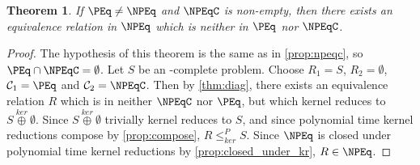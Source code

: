 \documentclass[draft]{article}
\newtheorem{theorem}{Theorem}[section]
\theoremstyle{definition} \newtheorem{openproblem}[openproblem]{Open problem}
\theoremstyle{definition} \newtheorem{definition}[definition]{Definition}
\theoremstyle{remark} \newtheorem{remark}{Remark}
\newcommand{\kj}{\overset{ker}{\oplus}} %
\newcommand{\kr}{\leq^{P}_{ker}} %
\newcommand{\printintermediarytheorem}{If $\PEq\neq\NPEq$ and $\NPEqC$ is non-empty, then there exists an equivalence relation in $\NPEq$ which is neither in $\PEq$ nor $\NPEqC$.}
\begin{document}
\begin{theorem}\label{thm:intermediary}
  \printintermediarytheorem
\end{theorem}
\begin{proof}
  The hypothesis of this theorem is the same as in \autoref{prop:npeqc}, so $\PEq\cap\NPEqC=\emptyset$.
  Let $S$ be an \NPEq-complete problem.
  Choose $R_1=S$, $R_2=\emptyset$, $\mathcal{C}_1=\PEq$ and $\mathcal{C}_2=\NPEqC$.
  Then by \autoref{thm:diag}, there exists an equivalence relation $R$ which is in neither $\NPEqC$ nor $\PEq$, but which kernel reduces to $S\kj\emptyset$.
  Since $S\kj\emptyset$ trivially kernel reduces to $S$, and since polynomial time kernel reductions compose by \autoref{prop:compose}, $R\kr S$.
  Since $\NPEq$ is closed under polynomial time kernel reductions by \autoref{prop:closed_under_kr}, $R\in\NPEq$.
\end{proof}

 
\end{document}
